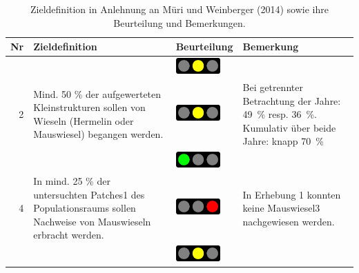 \documentclass[
]{scrbook}
\begin{document}
\begin{table}

\caption{\label{tab:winziele}Zieldefinition in Anlehnung an Müri und Weinberger (2014) sowie ihre Beurteilung und Bemerkungen.}
\centering
\begin{tabular}[t]{rp{65mm}>{}lp{60mm}}
\toprule
Nr & Zieldefinition & Beurteilung & Bemerkung\\
\midrule
\cellcolor{gray!6}{1} & \cellcolor{gray!6}{In jedem Populationsraum sollen zu jeder Kontrollperiode Mauswiesel und Hermelin nachgewiesen werden.} & \cellcolor{gray!6}{}\includegraphics[width=0.67in, height=0.24in]{images/ampel_gelb.png} & \cellcolor{gray!6}{Es konnten zwar Hermeline, aber keine Mauswiesel nachgewiesen werden.}\\
2 & Mind. 50 \% der aufgewerteten Kleinstrukturen sollen von Wieseln (Hermelin oder Mauswiesel) begangen werden. & \includegraphics[width=0.67in, height=0.24in]{images/ampel_gelb.png} & Bei getrennter Betrachtung der Jahre: 49 \% resp. 36 \%. Kumulativ über beide Jahre: knapp 70 \%\\
\cellcolor{gray!6}{3} & \cellcolor{gray!6}{In mind. 75 \% der untersuchten Patches1 des Populationsraums sollen Nachweise von Hermelinen erbracht werden.} & \cellcolor{gray!6}{}\includegraphics[width=0.67in, height=0.24in]{images/ampel_gruen.png} & \cellcolor{gray!6}{In 10 von 11 untersuchten Patches (91 \%) konnten Nachweise von Hermelinen erbracht werden.}\\
4 & In mind. 25 \% der untersuchten Patches1 des Populationsraums sollen Nachweise von Mauswieseln erbracht werden. & \includegraphics[width=0.67in, height=0.24in]{images/ampel_rot.png} & In Erhebung 1 konnten keine Mauswiesel3 nachgewiesen werden.\\
\cellcolor{gray!6}{5} & \cellcolor{gray!6}{In jeder untersuchten Verbindungsachse sollen mindestens einmal pro Jahr Wiesel (mindestens Hermeline) nachgewiesen werden.} & \cellcolor{gray!6}{}\includegraphics[width=0.67in, height=0.24in]{images/ampel_gelb.png} & \cellcolor{gray!6}{Gemäss Datensatz A2 konnten auf 4 von 5 kontrollierten Korridoren Nachweise von Hermelin und Iltis gemacht werden}\\
\bottomrule
\end{tabular}
\end{table}
\end{document}

